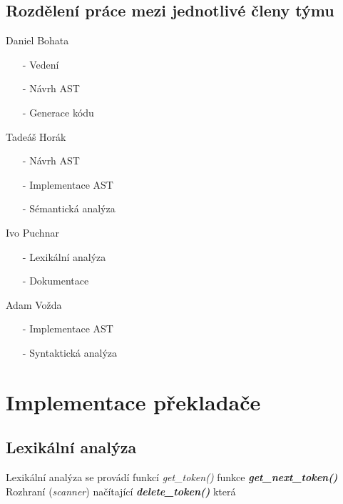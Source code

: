 \documentclass[a4paper, 12pt]{article}
\begin{document}
\subsection{Rozdělení práce mezi jednotlivé členy týmu}
\begin{itemize}
    \begin{minipage}{0.5\linewidth}   
        \item Daniel Bohata
        \begin{itemize}
        \item[-] Vedení
        \item[-] Návrh AST
        \item[-] Generace kódu 
        \end{itemize}
        \item Tadeáš Horák
        \begin{itemize}
        \item[-] Návrh AST
        \item[-] Implementace AST
        \item[-] Sémantická analýza
        \end{itemize}
        \item Ivo Puchnar
        \begin{itemize}
        \item[-] Lexikální analýza
        \item[-] Dokumentace
        \end{itemize}
        \item Adam Vožda
        \begin{itemize}
        \item[-] Implementace AST
        \item[-] Syntaktická analýza
        \end{itemize}
    \end{minipage}
\end{itemize}

\newpage
{}
\section{Implementace překladače}
\subsection{Lexikální analýza}
Lexikální analýza se provádí funkcí \textit{get\_token()} 
funkce \textit{\textbf{get\_next\_token()}} Rozhraní (\textit{scanner}) načítající \newline
\textit{\textbf{delete\_token()}} která
\end{document}
